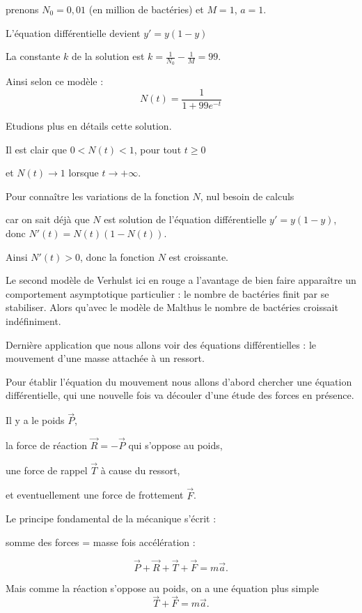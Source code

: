 \change
prenons $N_0 = 0,01$ (en million de bactéries) et $M=1$, $a=1$.

L'équation différentielle devient $y' = y(1 - y)$

\change
La constante $k$ de la solution est 
$k = \frac{1}{N_0}-\frac{1}{M} = 99$. 

\change
  Ainsi selon ce modèle :
  $$N(t) = \frac{1}{1 + 99 e^{-t}}$$ 
  
\change
Etudions plus en détails cette solution.

  Il est clair que $0<N(t)<1$, pour tout $t\ge0$ 
  
\change
et   $N(t) \to 1$ lorsque $t\to+\infty$.

\change   
  Pour connaître les variations de la fonction $N$, 
  nul besoin de calculs 
  

\change  
  car on sait déjà que 
  $N$ est solution de l'équation différentielle $y' = y(1 - y)$, donc
  $N'(t) = N(t)(1 - N(t))$.
  
  \change
  Ainsi $N'(t)>0$, donc la fonction $N$ est croissante.
  
  \change    
  Le second modèle de Verhulst ici en rouge a l'avantage de
bien faire apparaître un comportement asymptotique particulier :
le nombre de bactéries finit par se stabiliser. Alors qu'avec
le modèle de Malthus le nombre de bactéries croissait indéfiniment.

\diapo

Dernière application que nous allons voir des équations différentielles :
le mouvement d'une masse attachée à un ressort.

\change
Pour établir l'équation du mouvement nous allons d'abord chercher 
une équation différentielle, qui une nouvelle fois va découler
d'une étude des forces en présence.

\change
Il y a le poids $\vec P$,

\change
la force de réaction $\vec R=-\vec P$ qui s'oppose au poids,

\change
une force de rappel $\vec T$ à cause du ressort,

\change
et eventuellement une force de frottement $\vec F$.

\change
Le principe fondamental de la mécanique s'écrit :


\change
somme des forces = masse fois accélération :

$$\vec P + \vec R + \vec T + \vec F = m\vec a.$$

\change
Mais comme la réaction s'oppose au poids, on a une équation plus simple
$$\vec T + \vec F = m\vec a.$$




